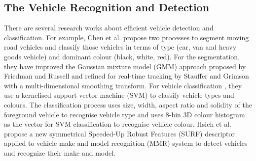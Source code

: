 \documentclass{llncs}
\begin{document}
\subsection{The Vehicle Recognition and Detection}
There are several research works about efficient vehicle detection and classification. 
For example, Chen et al. \cite{ZezhiChen} propose two processes to segment moving road vehicles and classify those vehicles in terms of type (car, van and heavy goods vehicle) and dominant colour (black, white, red).
For the segmentation, they have improved the Gaussian mixture model (GMM) approach proposed by Friedman and Russell \cite{Friedman} and refined for real-time tracking by Stauffer and Grimson \cite{Stauffer} with a multi-dimensional smoothing transform.
For vehicle classification \cite{ZezhiChen}, they use a kernelised support vector machine (SVM) to classify vehicle types and colours.
The classification process uses size, width, aspect ratio and solidity of the foreground vehicle to recognise vehicle type and uses 8-bin 3D colour histogram as the vector for SVM classification to recognise vehicle colour. 
%
Hsieh et al. \cite{Hsieh} propose a new symmetrical Speeded-Up Robust Features (SURF) descriptor applied to vehicle make and model recognition (MMR) system to detect vehicles and recognize their make and model.
\end{document}
